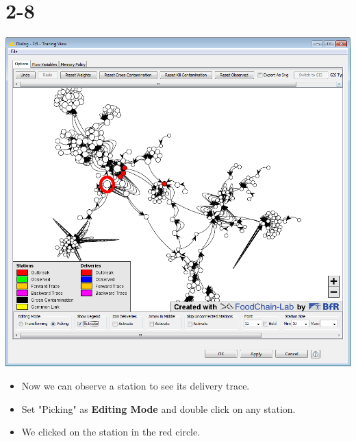 \documentclass[10pt]{beamer}
\begin{document}
\section{2-8}
\begin{frame}
	\begin{center}
  		\includegraphics[height=0.6\textheight]{2-8.png}
	\end{center}
	\begin{itemize}
		\item Now we can observe a station to see its delivery trace.
		\item Set "Picking" as \textbf{Editing Mode} and double click on any station.
		\item We clicked on the station in the red circle.
	\end{itemize}
\end{frame}
\end{document}
